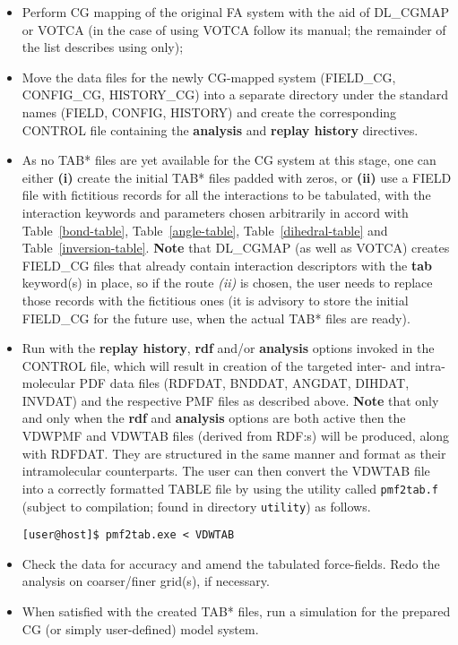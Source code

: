 \begin{itemize}
\item Perform CG mapping of the original FA system with the aid
of DL\_CGMAP or VOTCA (in the case of using VOTCA follow its manual;
the remainder of the list describes using \D only);
\item Move the data files for the newly CG-mapped system
(FIELD\_CG, CONFIG\_CG, HISTORY\_CG) into a separate directory
under the standard names (FIELD, CONFIG, HISTORY) and create
the corresponding CONTROL file containing the {\bf analysis}
and {\bf replay history} directives.
\item As no TAB* files are yet available for the CG system
at this stage, one can either {\bf (i)} create the initial TAB* files
padded with zeros, or {\bf (ii)} use a FIELD file with fictitious records
for all the interactions to be tabulated, with the interaction
keywords and parameters chosen arbitrarily in accord with
Table~\ref{bond-table}, Table~\ref{angle-table},
Table~\ref{dihedral-table} and Table~\ref{inversion-table}.
{\bf Note} that DL\_CGMAP (as well as VOTCA) creates FIELD\_CG files
that already contain interaction descriptors with the {\bf tab}
keyword(s) in place, so if the route {\em (ii)} is chosen,
the user needs to replace those records with the fictitious ones
(it is advisory to store the initial FIELD\_CG for the future
use, when the actual TAB* files are ready).
\item Run \D with the {\bf replay history}, {\bf rdf} and/or
{\bf analysis} options invoked in the CONTROL file, which
will result in creation of the targeted inter- and intra-molecular
PDF data files (RDFDAT, BNDDAT, ANGDAT, DIHDAT, INVDAT) and the
respective PMF files as described above.  {\bf Note} that only
and only when the {\bf rdf} and {\bf analysis} options are both
active then the VDWPMF and VDWTAB files (derived from RDF:s) will
be produced, along with RDFDAT.  They are structured in the same
manner and format as their intramolecular counterparts.  The user
can then convert the VDWTAB file into a correctly formatted TABLE
file by using the utility called {\tt pmf2tab.f} (subject to
compilation; found in \D directory {\tt utility}) as follows.


\begin{verbatim}
[user@host]$ pmf2tab.exe < VDWTAB
\end{verbatim}

\item Check the data for accuracy and amend the tabulated
force-fields. Redo the analysis on coarser/finer grid(s),
if necessary.

\item When satisfied with the created TAB* files, run
a \D simulation for the prepared CG (or simply user-defined)
model system.
\end{itemize}

